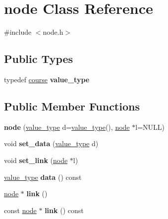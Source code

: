 \hypertarget{classnode}{}\section{node Class Reference}
\label{classnode}


{\ttfamily \#include $<$node.\+h$>$}

\subsection*{Public Types}
\begin{DoxyCompactItemize}
\item 
\mbox{\label{classnode_af79958a8234d1a3d642adf6637cb9f9b}} 
typedef \mbox{\hyperlink{classcourse}{course}} {\bfseries value\+\_\+type}
\end{DoxyCompactItemize}
\subsection*{Public Member Functions}
\begin{DoxyCompactItemize}
\item 
\mbox{\label{classnode_a4d89d50fbee6842a2588ef0c07063cb8}} 
{\bfseries node} (\mbox{\hyperlink{classcourse}{value\+\_\+type}} d=\mbox{\hyperlink{classcourse}{value\+\_\+type}}(), \mbox{\hyperlink{classnode}{node}} $\ast$l=N\+U\+LL)
\item 
\mbox{\label{classnode_ac9906af97ebcd35ffa46145f865eed6c}} 
void {\bfseries set\+\_\+data} (\mbox{\hyperlink{classcourse}{value\+\_\+type}} d)
\item 
\mbox{\label{classnode_ae9887204ac73c954e3a4da3fa15c9df9}} 
void {\bfseries set\+\_\+link} (\mbox{\hyperlink{classnode}{node}} $\ast$l)
\item 
\mbox{\label{classnode_aa608d1caf66b840edfa523ee7825c995}} 
\mbox{\hyperlink{classcourse}{value\+\_\+type}} {\bfseries data} () const
\item 
\mbox{\label{classnode_a3871737751cf0fd295a07c77d0c72f82}} 
\mbox{\hyperlink{classnode}{node}} $\ast$ {\bfseries link} ()
\item 
\mbox{\label{classnode_a1cdde999247cd38cf9dc9ee8fc91f5f7}} 
const \mbox{\hyperlink{classnode}{node}} $\ast$ {\bfseries link} () const
\end{DoxyCompactItemize}


